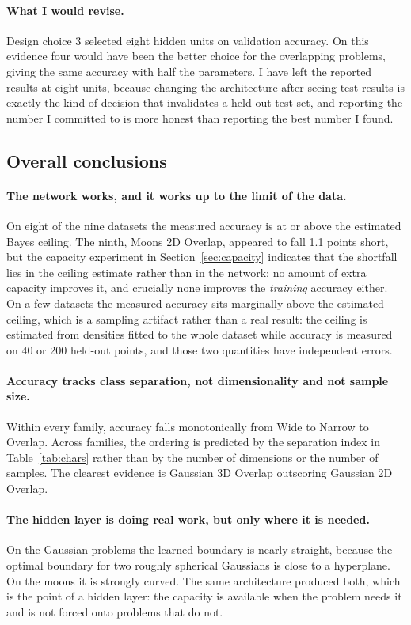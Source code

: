 \documentclass[11pt]{article}
\begin{document}
\paragraph{What I would revise.} Design choice 3 selected eight hidden units on
validation accuracy. On this evidence four would have been the better choice for
the overlapping problems, giving the same accuracy with half the parameters. I
have left the reported results at eight units, because changing the architecture
after seeing test results is exactly the kind of decision that invalidates a
held-out test set, and reporting the number I committed to is more honest than
reporting the best number I found.

\subsection{Overall conclusions}

\paragraph{The network works, and it works up to the limit of the data.}
On eight of the nine datasets the measured accuracy is at or above the estimated
Bayes ceiling. The ninth, Moons 2D Overlap, appeared to fall 1.1 points short,
but the capacity experiment in Section~\ref{sec:capacity} indicates that the
shortfall lies in the ceiling estimate rather than in the network: no amount of
extra capacity improves it, and crucially none improves the \emph{training}
accuracy either.
On a few datasets the measured accuracy sits marginally above the estimated
ceiling, which is a sampling artifact rather than a real result: the ceiling is
estimated from densities fitted to the whole dataset while accuracy is measured
on 40 or 200 held-out points, and those two quantities have independent errors.

\paragraph{Accuracy tracks class separation, not dimensionality and not
sample size.} Within every family, accuracy falls monotonically from Wide to
Narrow to Overlap. Across families, the ordering is predicted by the separation
index in Table~\ref{tab:chars} rather than by the number of dimensions or the
number of samples. The clearest evidence is Gaussian 3D Overlap outscoring
Gaussian 2D Overlap.

\paragraph{The hidden layer is doing real work, but only where it is needed.}
On the Gaussian problems the learned boundary is nearly straight, because the
optimal boundary for two roughly spherical Gaussians is close to a hyperplane.
On the moons it is strongly curved. The same architecture produced both, which
is the point of a hidden layer: the capacity is available when the problem needs
it and is not forced onto problems that do not.
\end{document}

